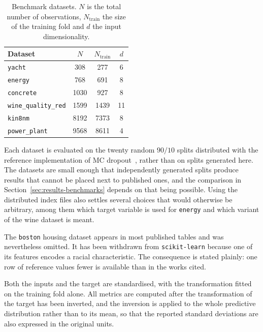 \begin{table}[htbp]
    \centering
    \caption{Benchmark datasets. $N$ is the total number of observations, $N_{\mathrm{train}}$
    the size of the training fold and $d$ the input dimensionality.}
    \label{tab:datasets}
    \begin{tabular}{lccc}
        \hline
        Dataset & $N$ & $N_{\mathrm{train}}$ & $d$ \\
        \hline
        \texttt{yacht}              & 308  & 277  & 6  \\
        \texttt{energy}             & 768  & 691  & 8  \\
        \texttt{concrete}           & 1030 & 927  & 8  \\
        \texttt{wine\_quality\_red} & 1599 & 1439 & 11 \\
        \texttt{kin8nm}             & 8192 & 7373 & 8  \\
        \texttt{power\_plant}       & 9568 & 8611 & 4  \\
        \hline
    \end{tabular}
\end{table}

Each dataset is evaluated on the twenty random $90/10$ splits distributed with the
reference implementation of MC dropout~\cite{gal2016}, rather than on splits generated
here. The datasets are small enough that independently generated splits produce results
that cannot be placed next to published ones, and the comparison in
Section~\ref{sec:results-benchmarks} depends on that being possible. Using the
distributed index files also settles several choices that would otherwise be arbitrary,
among them which target variable is used for \texttt{energy} and which variant of the
wine dataset is meant.

The \texttt{boston} housing dataset appears in most published tables and was
nevertheless omitted. It has been withdrawn from \texttt{scikit-learn} because one of
its features encodes a racial characteristic. The consequence is stated plainly: one
row of reference values fewer is available than in the works cited.

Both the inputs and the target are standardised, with the transformation fitted on the
training fold alone. All metrics are computed after the transformation of the target
has been inverted, and the inversion is applied to the whole predictive distribution
rather than to its mean, so that the reported standard deviations are also expressed in
the original units.

